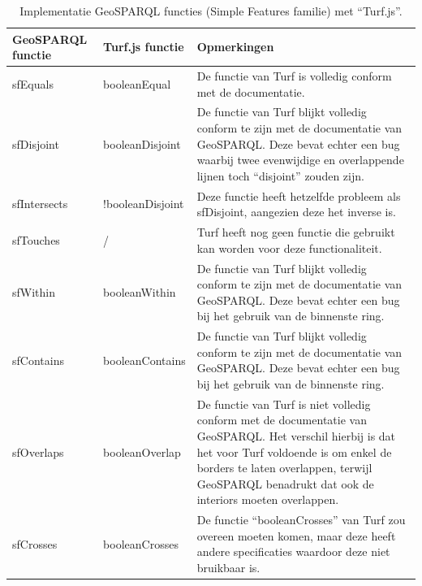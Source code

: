 \begin{table}[ht]
    \centering
    \begin{tabular}{ |p{2cm}|p{2cm}|p{8cm}| } 
        \hline
        \rowcolor{TableHeaderColor} GeoSPARQL functie & Turf.js functie & Opmerkingen \\ \hline
        
        \rowcolor{TableColor} sfEquals & booleanEqual & De functie van Turf is volledig conform met de documentatie. \\ \hline

        \rowcolor{TableColor} sfDisjoint & booleanDisjoint & De functie van Turf blijkt volledig conform te zijn met de documentatie van GeoSPARQL. Deze bevat echter een bug waarbij twee evenwijdige en overlappende lijnen toch ``disjoint'' zouden zijn. \\ \hline

        \rowcolor{TableColor} sfIntersects & !booleanDisjoint & Deze functie heeft hetzelfde probleem als sfDisjoint, aangezien deze het inverse is. \\ \hline

        \rowcolor{TableColor} sfTouches & / & Turf heeft nog geen functie die gebruikt kan worden voor deze functionaliteit. \\ \hline

        \rowcolor{TableColor} sfWithin & booleanWithin & De functie van Turf blijkt volledig conform te zijn met de documentatie van GeoSPARQL. Deze bevat echter een bug bij het gebruik van de binnenste ring. \\ \hline

        \rowcolor{TableColor} sfContains & booleanContains & De functie van Turf blijkt volledig conform te zijn met de documentatie van GeoSPARQL. Deze bevat echter een bug bij het gebruik van de binnenste ring. \\ \hline

        \rowcolor{TableColor} sfOverlaps & booleanOverlap & De functie van Turf is niet volledig conform met de documentatie van GeoSPARQL. Het verschil hierbij is dat het voor Turf voldoende is om enkel de borders te laten overlappen, terwijl GeoSPARQL benadrukt dat ook de interiors moeten overlappen. \\ \hline

        \rowcolor{TableColor} sfCrosses & booleanCrosses & De functie ``booleanCrosses'' van Turf zou overeen moeten komen, maar deze heeft andere specificaties waardoor deze niet bruikbaar is.  \\ \hline
    \end{tabular}
    \caption{Implementatie GeoSPARQL functies (Simple Features familie) met ``Turf.js''.}
    \label{tab:turf_functions}
\end{table}